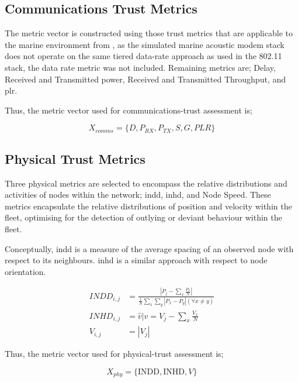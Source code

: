 \subsection{Communications Trust Metrics}

The metric vector is constructed using those trust metrics that are applicable to the marine environment from \cite{Guo2012}, as the simulated marine acoustic modem stack does not operate on the same tiered data-rate approach as used in the 802.11 stack, the data rate metric was not included. Remaining metrics are; Delay, Received and Transmitted power, Received and Transmitted Throughput, and \gls{plr}.

Thus, the metric vector used for communications-trust assessment is;

\begin{equation}
  X_{comms}=\{D, P_{RX}, P_{TX}, S, G, PLR\}
  \label{eq:comms_vector}
\end{equation}

\subsection{Physical Trust Metrics}

Three physical metrics are selected to encompass the relative distributions and activities of nodes within the network; \gls{indd}, \gls{inhd}, and Node Speed. These metrics encapsulate the relative distributions of position and velocity within the fleet, optimising for the detection of outlying or deviant behaviour within the fleet.

Conceptually, \gls{indd} is a measure of the average spacing of an observed node with respect to its neighbours. \gls{inhd} is a similar approach with respect to node orientation.

\begin{align}
  INDD_{i,j} &= \frac{|P_j - \sum_x \frac{P_x}{N}|}{\frac{1}{N}\sum_x \sum_y{|P_x - P_y| (\forall x \neq y)}}\\
  INHD_{i,j} &= \hat{v} \vert v= V_j - \sum_x{\frac{V_x}{N}}\\
  V_{i,j} &= |V_j|
\end{align}

Thus, the metric vector used for physical-trust assessment is;

\begin{equation}
  X_{phy}=\{\text{INDD}, \text{INHD}, V\}
  \label{eq:phys:vector}
\end{equation}

